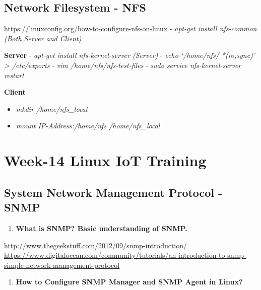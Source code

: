 \documentclass[letterpaper,10pt,english]{sphinxmanual}
\begin{document}
\section{Network Filesystem - NFS}
\label{week-13:network-filesystem-nfs}
\href{https://linuxconfig.org/how-to-configure-nfs-on-linux}{https://linuxconfig.org/how-to-configure-nfs-on-linux}
- \emph{apt-get install nfs-common (Both Server and Client)}

\textbf{Server}
- \emph{apt-get install nfs-kernel-server (Server)}
- \emph{echo `/home/nfs/ *(ro,sync)' \textgreater{} /etc/exports}
- \emph{vim /home/nfs/nfs-test-files}
- \emph{sudo service  nfs-kernel-server restart}

\textbf{Client}
\begin{itemize}
\item {} 
\emph{mkdir /home/nfs\_local}

\item {} 
\emph{mount IP-Address:/home/nfs /home/nfs\_local}

\end{itemize}


\chapter{Week-14 Linux IoT Training}
\label{week-14::doc}\label{week-14:week-14}\label{week-14:week-14-linux-iot-training}

\section{System Network Management Protocol - SNMP}
\label{week-14:system-network-management-protocol-snmp}\begin{enumerate}
\item {} 
\textbf{What is SNMP? Basic understanding of SNMP.}

\end{enumerate}

\href{http://www.thegeekstuff.com/2012/09/snmp-introduction/}{http://www.thegeekstuff.com/2012/09/snmp-introduction/}
\href{https://www.digitalocean.com/community/tutorials/an-introduction-to-snmp-simple-network-management-protocol}{https://www.digitalocean.com/community/tutorials/an-introduction-to-snmp-simple-network-management-protocol}
\begin{enumerate}
\item {} 
\textbf{How to Configure SNMP Manager and SNMP Agent in Linux?}

\end{enumerate}
\end{document}
